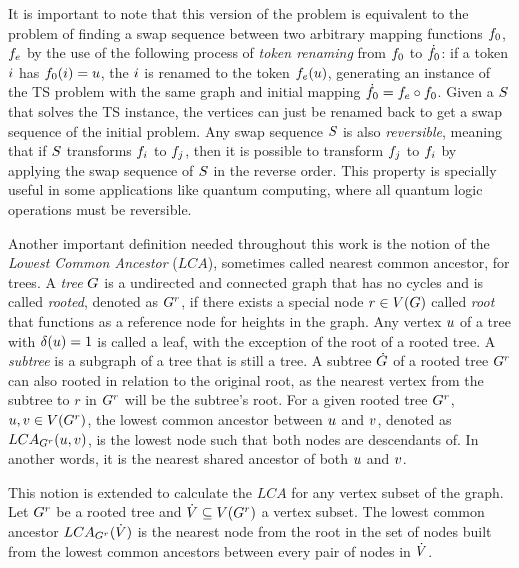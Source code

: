 \documentclass[msc,english,table,xcdraw]{ppgccufmg}
\begin{document}

It is important to note that this version of the problem is equivalent to the
problem of finding a swap sequence between two arbitrary mapping functions
$f_{0}$, $f_e$ by the use of the following process of \textit{token
renaming} from $f_{0}$ to $\dot{f_{0}}$: if a token $i$ has
$f_{0}(i) = u$, the $i$ is renamed to the 
token $f_{e}(u)$, generating an instance of the TS
problem with the same graph and initial mapping $\dot{f_{0}} = f_{e}
\circ f_{0}$. 
Given a $S$ that solves the TS instance, the vertices can just be renamed 
back to get a swap sequence of the initial problem.
Any swap sequence $S$ is also \textit{reversible}, meaning that if 
$S$ transforms $f_{i}$ to $f_{j}$, then it is possible
to transform $f_{j}$ to $f_{i}$ by applying the swap 
sequence of $S$ in the reverse order.
This property is specially useful in some applications like quantum computing,
where all quantum logic operations must be reversible.


Another important definition needed throughout this work is the notion of the
\textit{Lowest Common Ancestor} ($LCA$), sometimes called nearest common 
ancestor, for trees. 
A \textit{tree} $G$ is a undirected and connected graph that has no cycles 
and is called \textit{rooted}, denoted as $G^{r}$, if there exists a special 
node $r \in V(G)$ called \textit{root} that functions as a reference 
node for heights in the graph.
Any vertex $u$ of a tree with $\delta(u) = 1$ is called a leaf, 
with the exception of the root of a rooted tree.
A \textit{subtree} is a subgraph of a tree that is still a tree. 
A subtree $\dot{G}$ of a rooted tree $G^{r}$ can also rooted in relation 
to the original root, as the nearest vertex from the subtree to $r$ in 
$G^{r}$ will be the subtree's root.
For a given rooted tree $G^{r}$, $u,v \in V(G^{r})$, the 
lowest common ancestor between $u$ and $v$, denoted as $LCA_{G^{r}}(u, v)$, is the lowest node such that both nodes are descendants 
of.
In another words, it is the nearest shared ancestor of both $u$ and
$v$.


This notion is extended to calculate the $LCA$ for any vertex subset of the 
graph. 
Let $G^{r}$ be a rooted tree and $\dot{V} \subseteq V(G^{r})$ a 
vertex subset. 
The lowest common ancestor $LCA_{G^{r}}(\dot{V})$ is the nearest node from 
the root in the set of nodes built from the lowest common ancestors between 
every pair of nodes in $\dot{V}$.
\end{document}
